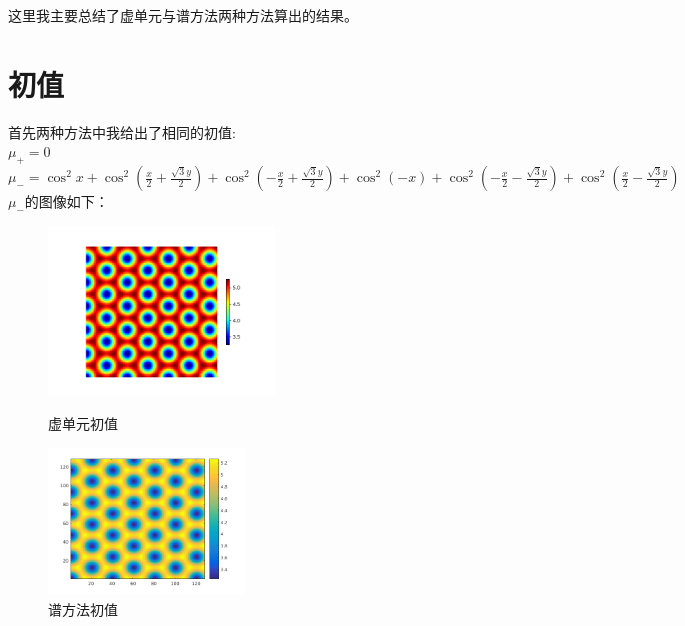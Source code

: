 \documentclass[12pt]{article}
\begin{document}
\begin{CJK}{UTF8}{gkai}	
\title{}
\date{\today}
\author{王鑫}
\maketitle

这里我主要总结了虚单元与谱方法两种方法算出的结果。\\
\section{初值}
 首先两种方法中我给出了相同的初值:\\
 
 $ \mu_+=0 $\\
 
 $ \mu_-=\cos^{2}x+\cos^2 (\frac{x}{2}+\frac{\sqrt{3}y}{2})+\cos^2(-\frac{x}{2}+\frac{\sqrt{3}y}{2})+\cos^{2}(-x)+\cos^2 (-\frac{x}{2}-\frac{\sqrt{3}y}{2})+\cos^2 (\frac{x}{2}-\frac{\sqrt{3}y}{2})$\\
 
 $\mu_-$的图像如下：\\
 \begin{figure}[H]
 	\setlength{\abovecaptionskip}{0.cm}
 	\setlength{\belowcaptionskip}{-0.cm}
 	\begin{minipage}[!htbp]{0.3\linewidth}
 		\includegraphics[width=6cm]{Figure_1.png}
 		\caption*{虚单元初值}
 	\end{minipage}
 	\hspace{0.23in}
 	\begin{minipage}[!htbp]{0.3\linewidth}
 		\includegraphics[width=5.2cm]{0.png}
 		\caption*{谱方法初值}
 	\end{minipage}
 \end{figure} 

\end{CJK}
\end{document}
